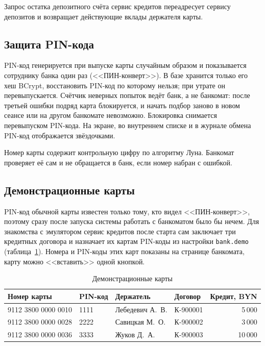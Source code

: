 \documentclass[14pt,a4paper]{extarticle}
\begin{document}
Запрос остатка депозитного счёта сервис кредитов переадресует сервису депозитов и
возвращает действующие вклады держателя карты.

\subsection{Защита PIN-кода}

PIN-код генерируется при выпуске карты случайным образом и показывается сотруднику
банка один раз (<<ПИН-конверт>>). В базе хранится только его хеш BCrypt, восстановить
PIN-код по которому нельзя; при утрате он перевыпускается. Счётчик неверных попыток
ведёт банк, а не банкомат: после третьей ошибки подряд карта блокируется, и начать подбор
заново в новом сеансе или на другом банкомате невозможно. Блокировка снимается
перевыпуском PIN-кода. На экране, во внутреннем списке и в журнале обмена PIN-код
отображается звёздочками.

Номер карты содержит контрольную цифру по алгоритму Луна. Банкомат проверяет её сам и
не обращается в банк, если номер набран с ошибкой.

\subsection{Демонстрационные карты}

PIN-код обычной карты известен только тому, кто видел <<ПИН-конверт>>, поэтому сразу после
запуска системы работать с банкоматом было бы нечем. Для знакомства с эмулятором сервис
кредитов после старта сам заключает три кредитных договора и назначает их картам PIN-коды из
настройки \texttt{bank.demo} (таблица~\ref{tab:demo}). Номера и PIN-коды этих карт показаны на
странице банкомата, карту можно <<вставить>> одной кнопкой.

\begin{table}[H]
\caption{Демонстрационные карты}
\label{tab:demo}
\centering
\small
\begin{tabular}{llllr}
\toprule
Номер карты & PIN-код & Держатель & Договор & Кредит, BYN \\
\midrule
9112 3800 0000 0010 & 1111 & Лебедевич А.~В. & К-900001 & 5\,000 \\
9112 3800 0000 0028 & 2222 & Савицкая М.~О. & К-900002 & 3\,000 \\
9112 3800 0000 0036 & 3333 & Жуков Д.~А. & К-900003 & 10\,000 \\
\bottomrule
\end{tabular}
\end{table}
\end{document}
